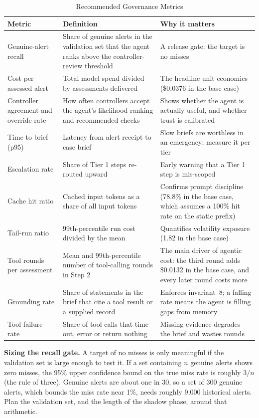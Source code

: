 \documentclass[conference]{IEEEtran}
\begin{document}
\begin{table}[!t]
\caption{Recommended Governance Metrics}
\label{tab:metrics}
\centering
\footnotesize
\begin{tabularx}{\textwidth}{@{}l Y Y@{}}
\toprule
\textbf{Metric} & \textbf{Definition} & \textbf{Why it matters} \\
\midrule
Genuine-alert recall & Share of genuine alerts in the validation set that the agent ranks above the controller-review threshold & A release gate: the target is no misses \\
Cost per assessed alert & Total model spend divided by assessments delivered & The headline unit economics (\$0.0376 in the base case) \\
Controller agreement and override rate & How often controllers accept the agent's likelihood ranking and recommended checks & Shows whether the agent is actually useful, and whether trust is calibrated \\
Time to brief (p95) & Latency from alert receipt to case brief & Slow briefs are worthless in an emergency; measure it per tier \\
Escalation rate & Share of Tier 1 steps re-routed upward & Early warning that a Tier 1 step is mis-scoped \\
Cache hit ratio & Cached input tokens as a share of all input tokens & Confirms prompt discipline (78.8\% in the base case, which assumes a 100\% hit rate on the static prefix) \\
Tail-run ratio & 99th-percentile run cost divided by the mean & Quantifies volatility exposure (1.82 in the base case) \\
Tool rounds per assessment & Mean and 99th-percentile number of tool-calling rounds in Step 2 & The main driver of agentic cost: the third round adds \$0.0132 in the base case, and every later round costs more \\
Grounding rate & Share of statements in the brief that cite a tool result or a supplied record & Enforces invariant~8; a falling rate means the agent is filling gaps from memory \\
Tool failure rate & Share of tool calls that time out, error or return nothing & Missing evidence degrades the brief and wastes rounds \\
\bottomrule
\end{tabularx}
\end{table}

\textbf{Sizing the recall gate.} A target of no misses is only meaningful if the validation set is large enough to test it. If a set containing $n$ genuine alerts shows zero misses, the 95\% upper confidence bound on the true miss rate is roughly $3/n$ (the rule of three). Genuine alerts are about one in 30, so a set of 300 genuine alerts, which bounds the miss rate near 1\%, needs roughly 9,000 historical alerts. Plan the validation set, and the length of the shadow phase, around that arithmetic.
\end{document}
